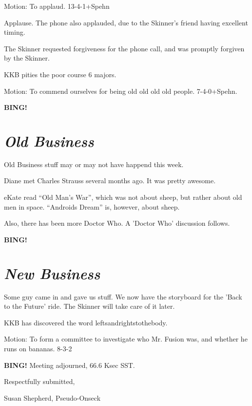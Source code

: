 \documentclass[10pt]{article}
\newcommand{\bing}{{\bf BING!} }
\newcommand{\goto}[1]{\bing \vskip 12pt \section*{{\em{#1}}}}
\begin{document}
Motion: To applaud. 13-4-1+Spehn

Applause. The phone also applauded, due to the Skinner's friend having excellent timing.

The Skinner requested forgiveness for the phone call, and was promptly forgiven by the Skinner.

KKB pities the poor course 6 majors.

Motion: To commend ourselves for being old old old old people. 7-4-0+Spehn.

\BING

\goto{Old Business}

Old Business stuff may or may not have happend this week.

Diane met Charles Strauss several months ago. It was pretty awesome.

eKate read ``Old Man's War'', which was not about sheep, but rather about old men in space. ``Androids Dream'' is, however, about sheep.

Also, there has been more Doctor Who. A 'Doctor Who' discussion follows.

\BING

\goto{New Business}

Some guy came in and gave us stuff. We now have the storyboard for the 'Back to the Future' ride. The Skinner will take care of it later.

KKB has discovered the word leftsandrightstothebody.

Motion: To form a committee to investigate who Mr. Fusion was, and whether he runs on bananas. 8-3-2 

\bing
\noindent
Meeting adjourned, 66.6 Ksec SST.

\vspace{18pt}

\centerline{Respectfully submitted,}
\centerline{Susan Shepherd, Pseudo-Onseck}
\end{document}
